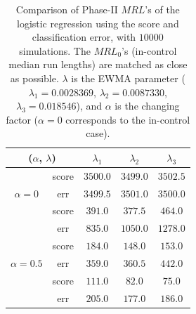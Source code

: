 \documentclass[twoside,11pt]{article}
\begin{document}
\begin{appendix}
\begin{table}[H]
\centering
\begin{tabular}{ccccc}
\toprule
\multicolumn{2}{c}{($ \alpha$, $ \lambda$)} & {$  \lambda_1$} & {$ \lambda_2$} & {$ \lambda_3$} \\
\midrule
\multirow{3}{*}{$\alpha = 0$} & score &$3500.0$ & $3499.0$ & $3502.5$ \\
& err &$3499.5$ & $3501.0$ & $3500.0$ \\
\midrule
\multirow{3}{*}{$\alpha = 0.3$} & score &$\bm{391.0}$ & $\bm{377.5}$ & $\bm{464.0}$ \\
& err &$835.0$ & $1050.0$ & $1278.0$ \\
\midrule
\multirow{3}{*}{$\alpha = 0.5$} & score &$\bm{184.0}$ & $\bm{148.0}$ & $\bm{153.0}$ \\
& err &$359.0$ & $360.5$ & $442.0$ \\
\midrule
\multirow{3}{*}{$\alpha = 0.7$} & score &$\bm{111.0}$ & $\bm{82.0}$ & $\bm{75.0}$ \\
& err &$205.0$ & $177.0$ & $186.0$ \\
\midrule
\end{tabular}
\caption{Comparison of Phase-II $MRL$'s of the logistic regression using the score and classification error, with $10000$ simulations. The $MRL_0$'s (in-control median run lengths) are matched as close as possible. $ \lambda$ is the EWMA parameter ({$ \lambda_1 = 0.0028369$}, {$ \lambda_2 = 0.0087330$}, {$ \lambda_3 = 0.018546$}), and $ \alpha$ is the changing factor ($ \alpha=0$ corresponds to the in-control case).}
\label{tab:logi_MRL}
\end{table}



\end{appendix}
\end{document}
